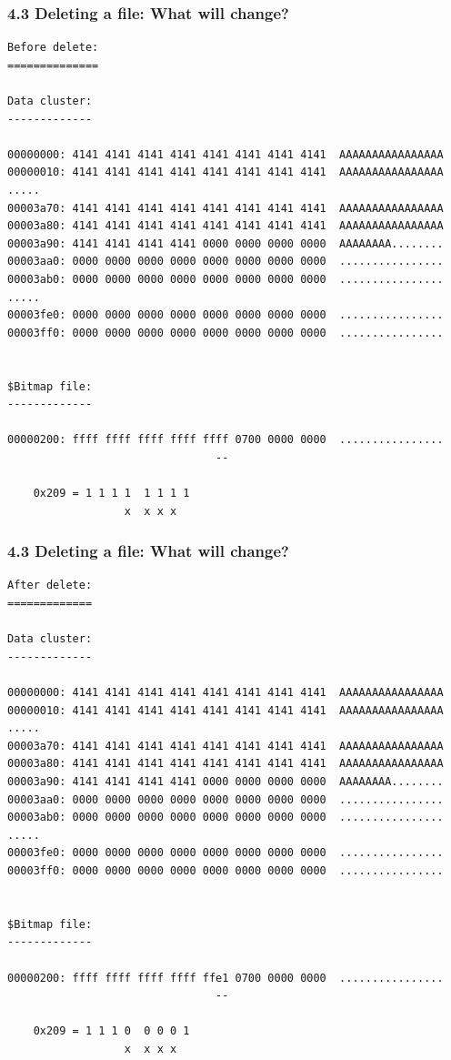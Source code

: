 \begin{frame}[fragile]
  \frametitle{4.3 Deleting a file: What will change?}
  \begin{lstlisting}[basicstyle=\tiny]
Before delete:
==============
  
Data cluster:
-------------

00000000: 4141 4141 4141 4141 4141 4141 4141 4141  AAAAAAAAAAAAAAAA
00000010: 4141 4141 4141 4141 4141 4141 4141 4141  AAAAAAAAAAAAAAAA
.....
00003a70: 4141 4141 4141 4141 4141 4141 4141 4141  AAAAAAAAAAAAAAAA
00003a80: 4141 4141 4141 4141 4141 4141 4141 4141  AAAAAAAAAAAAAAAA
00003a90: 4141 4141 4141 4141 0000 0000 0000 0000  AAAAAAAA........
00003aa0: 0000 0000 0000 0000 0000 0000 0000 0000  ................
00003ab0: 0000 0000 0000 0000 0000 0000 0000 0000  ................
.....
00003fe0: 0000 0000 0000 0000 0000 0000 0000 0000  ................
00003ff0: 0000 0000 0000 0000 0000 0000 0000 0000  ................


$Bitmap file:
-------------

00000200: ffff ffff ffff ffff ffff 0700 0000 0000  ................
                                --

	0x209 = 1 1 1 1  1 1 1 1
	              x  x x x
  \end{lstlisting}
\end{frame}


\begin{frame}[fragile]
  \frametitle{4.3 Deleting a file: What will change?}
  \begin{lstlisting}[basicstyle=\tiny]
After delete:
=============
  
Data cluster:
-------------

00000000: 4141 4141 4141 4141 4141 4141 4141 4141  AAAAAAAAAAAAAAAA
00000010: 4141 4141 4141 4141 4141 4141 4141 4141  AAAAAAAAAAAAAAAA
.....
00003a70: 4141 4141 4141 4141 4141 4141 4141 4141  AAAAAAAAAAAAAAAA
00003a80: 4141 4141 4141 4141 4141 4141 4141 4141  AAAAAAAAAAAAAAAA
00003a90: 4141 4141 4141 4141 0000 0000 0000 0000  AAAAAAAA........
00003aa0: 0000 0000 0000 0000 0000 0000 0000 0000  ................
00003ab0: 0000 0000 0000 0000 0000 0000 0000 0000  ................
.....
00003fe0: 0000 0000 0000 0000 0000 0000 0000 0000  ................
00003ff0: 0000 0000 0000 0000 0000 0000 0000 0000  ................


$Bitmap file:
-------------

00000200: ffff ffff ffff ffff ffe1 0700 0000 0000  ................
                                --

	0x209 = 1 1 1 0  0 0 0 1
	              x  x x x
  \end{lstlisting}
\end{frame}


